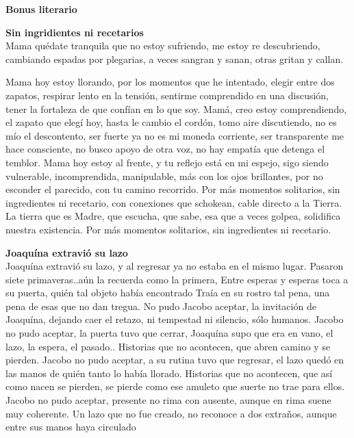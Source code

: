 \documentclass[12pt, a4paper, twoside]{book} %
\begin{document}
\noindent\textbf{Bonus literario}\\

\clearpage

\noindent\textbf{Sin ingridientes ni recetarios}\\
Mama quédate tranquila que no estoy sufriendo, me estoy re descubriendo, cambiando espadas por plegarias, a veces sangran y sanan, otras gritan y callan.

Mama hoy estoy llorando, por los momentos que he intentado, elegir entre dos zapatos, respirar lento en la tensión, sentirme comprendido en una discusión, tener la fortaleza de que confían en lo que soy.
Mamá, creo estoy comprendiendo, el zapato que elegí hoy, hasta le cambio el cordón, tomo aire discutiendo, no es mío el descontento, ser fuerte ya no es mi moneda corriente, ser transparente me hace consciente, no busco apoyo de otra voz, no hay empatía que detenga el temblor.
Mama hoy estoy al frente, y tu reflejo está en mi espejo, sigo siendo vulnerable, incomprendida, manipulable, más con los ojos brillantes, por no esconder el parecido, con tu camino recorrido.
Por más momentos solitarios, sin ingredientes ni recetario, con conexiones que schokean, cable directo a la Tierra.
La tierra que es Madre, que escucha, que sabe, esa que a veces golpea, solidifica nuestra existencia.
Por más momentos solitarios, sin ingredientes ni recetario.

\clearpage

\noindent\textbf{Joaquína extravió su lazo}\\
Joaquína extravió su lazo, y al regresar ya no estaba en el mismo lugar.
Pasaron siete primaveras..aún la recuerda como la primera,
Entre esperas y esperas  toca a su puerta, quién tal objeto había encontrado
Traía en su rostro tal pena, una pena de esas que no dan tregua.
No pudo Jacobo aceptar, la invitación de Joaquína, dejando caer el retazo, ni tempestad ni silencio, sólo humanos.
Jacobo no pudo aceptar, la puerta tuvo que cerrar,
Joaquína supo que era en vano,  el lazo, la espera, el pasado..
Historias que no acontecen, que abren camino y se pierden.
Jacobo no pudo aceptar, a su rutina tuvo que regresar, el lazo quedó en las manos de quién tanto lo había llorado.
Historias que no acontecen, que así como nacen se pierden, se pierde como ese amuleto que suerte no trae para ellos.
Jacobo no pudo aceptar, presente no rima con ausente, aunque en rima suene muy coherente.
Un lazo que no fue creado, no reconoce a dos extraños, aunque entre sus manos  haya circulado
\end{document}
